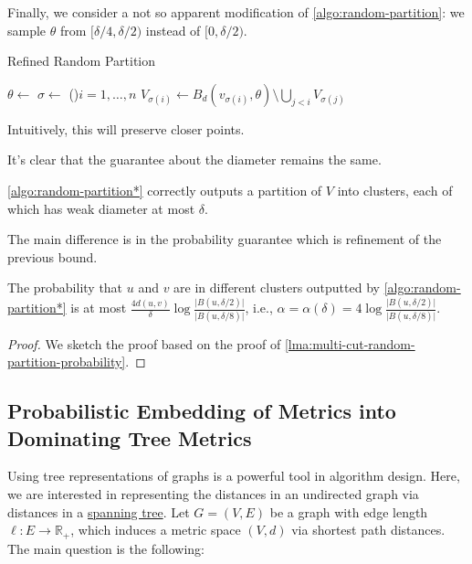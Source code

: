 Finally, we consider a not so apparent modification of \autoref{algo:random-partition}: we sample \(\theta \) from \([\delta / 4, \delta / 2)\) instead of \([0, \delta / 2)\).

\begin{algorithm}[H]\label{algo:random-partition*}
  \DontPrintSemicolon{}
  \caption{Refined Random Partition~\cite{calinescu2005approximation}}

  \BlankLine

  \(\theta \gets\)\uniform{\([\delta / 4, \delta / 2)\)}\;
  \(\sigma \gets\)
  \For(){\(i = 1, \dots , n\)}{
    \(V_{\sigma (i)} \gets B_d(v_{\sigma (i)}, \theta ) \setminus \bigcup_{j < i} V_{\sigma (j)}\)\;
  }
  \;
\end{algorithm}

\begin{intuition}
  Intuitively, this will preserve closer points.
\end{intuition}

It's clear that the guarantee about the diameter remains the same.

\begin{claim}
  \autoref{algo:random-partition*} correctly outputs a partition of \(V\) into clusters, each of which has weak diameter at most \(\delta \).
\end{claim}

The main difference is in the probability guarantee which is refinement of the previous bound.

\begin{theorem}\label{thm:random-partition*}
  The probability that \(u\) and \(v\) are in different clusters outputted by \autoref{algo:random-partition*} is at most \(\frac{4 d(u, v)}{\delta } \log \frac{\lvert B(u, \delta / 2) \rvert }{\lvert B(u, \delta / 8) \rvert }\), i.e., \(\alpha = \alpha (\delta ) = 4 \log \frac{\lvert B(u, \delta / 2) \rvert }{\lvert B(u, \delta / 8) \rvert }\).
\end{theorem}
\begin{proof}
  We sketch the proof based on the proof of \autoref{lma:multi-cut-random-partition-probability}.
\end{proof}

\subsection{Probabilistic Embedding of Metrics into Dominating Tree Metrics}
Using tree representations of graphs is a powerful tool in algorithm design. Here, we are interested in representing the distances in an undirected graph via distances in a \hyperref[def:spanning-tree]{spanning tree}. Let \(G = (V, E)\) be a graph with edge length \(\ell \colon E \to \mathbb{R} _+\), which induces a metric space \((V, d)\) via shortest path distances. The main question is the following:

